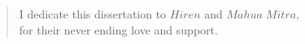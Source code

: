 \vspace*{\fill}
\vspace*{-2in}
\begin{quote}
    \center
    I dedicate this dissertation to $Hiren$ and $Mahua\;Mitra$, \\
    for their never ending love and support.
\end{quote}
\vspace*{\fill}

